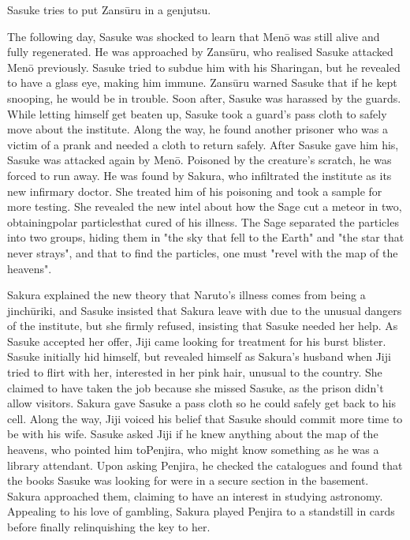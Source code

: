 \documentclass[a4paper,12pt]{article}
\begin{document}
Sasuke tries to put Zansūru in a genjutsu.\\ \par \vspace{0.5cm}

The following day, Sasuke was shocked to learn that Menō was still alive and fully regenerated. He was approached by Zansūru, who realised Sasuke attacked Menō previously. Sasuke tried to subdue him with his Sharingan, but he revealed to have a glass eye, making him immune. Zansūru warned Sasuke that if he kept snooping, he would be in trouble. Soon after, Sasuke was harassed by the guards. While letting himself get beaten up, Sasuke took a guard's pass cloth to safely move about the institute. Along the way, he found another prisoner who was a victim of a prank and needed a cloth to return safely. After Sasuke gave him his, Sasuke was attacked again by Menō. Poisoned by the creature's scratch, he was forced to run away. He was found by Sakura, who infiltrated the institute as its new infirmary doctor. She treated him of his poisoning and took a sample for more testing. She revealed the new intel about how the Sage cut a meteor in two, obtainingpolar particlesthat cured of his illness. The Sage separated the particles into two groups, hiding them in "the sky that fell to the Earth" and "the star that never strays", and that to find the particles, one must "revel with the map of the heavens".\\ \par \vspace{0.5cm}

Sakura explained the new theory that Naruto's illness comes from being a jinchūriki, and Sasuke insisted that Sakura leave with due to the unusual dangers of the institute, but she firmly refused, insisting that Sasuke needed her help. As Sasuke accepted her offer, Jiji came looking for treatment for his burst blister. Sasuke initially hid himself, but revealed himself as Sakura's husband when Jiji tried to flirt with her, interested in her pink hair, unusual to the country. She claimed to have taken the job because she missed Sasuke, as the prison didn't allow visitors. Sakura gave Sasuke a pass cloth so he could safely get back to his cell. Along the way, Jiji voiced his belief that Sasuke should commit more time to be with his wife. Sasuke asked Jiji if he knew anything about the map of the heavens, who pointed him toPenjira, who might know something as he was a library attendant. Upon asking Penjira, he checked the catalogues and found that the books Sasuke was looking for were in a secure section in the basement. Sakura approached them, claiming to have an interest in studying astronomy. Appealing to his love of gambling, Sakura played Penjira to a standstill in cards before finally relinquishing the key to her.\\ \par \vspace{0.5cm}
\end{document}
